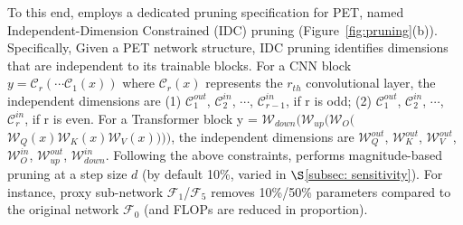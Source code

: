 To this end, \sys employs a dedicated pruning specification for PET, named Independent-Dimension Constrained (IDC) pruning (Figure~\ref{fig:pruning}(b)). 
Specifically, Given a PET network structure, IDC pruning identifies dimensions that are independent to its trainable blocks.
For a CNN block $y = \mathcal{C}_{r}(\cdots\mathcal{C}_{1}(x))$ where $\mathcal{C}_{r}(x)$ represents the $r_{th}$ convolutional layer, the independent dimensions are (1) $\mathcal{C}_{1}^{out}$, $\mathcal{C}_{2}^{in}$, $\cdots$, $\mathcal{C}_{r-1}^{in}$, if r is odd;
(2) $\mathcal{C}_{1}^{out}$, $\mathcal{C}_{2}^{in}$, $\cdots$, $\mathcal{C}_{r}^{in}$, if r is even.
For a Transformer block y = {\footnotesize $\mathcal{W}_{down}(\mathcal{W}_{up}(\mathcal{W}_{O}($$\mathcal{W}_{Q}(x)\mathcal{W}_{K}(x)\mathcal{W}_{V}(x))))$}, the independent dimensions are {\footnotesize $\mathcal{W}_{Q}^{out}$, $\mathcal{W}_{K}^{out}$, $\mathcal{W}_{V}^{out}$, $\mathcal{W}_{O}^{in}$, $\mathcal{W}_{up}^{out}$, $\mathcal{W}_{down}^{in}$}.
Following the above constraints, \sys performs magnitude-based pruning at a step size $d$ (by default 10\%, varied in $\S$\ref{subsec: sensitivity}).
For instance, proxy sub-network $\mathcal{F}_{1}$/$\mathcal{F}_{5}$ removes 10\%/50\% parameters compared to the original network $\mathcal{F}_{0}$ (and FLOPs are reduced in proportion).

